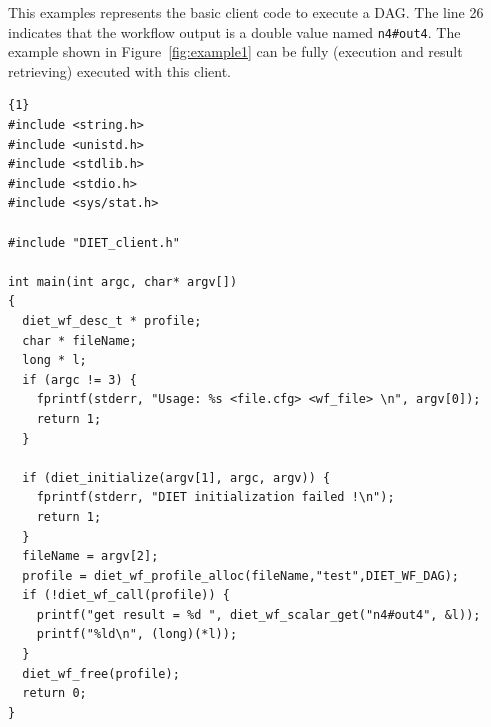 This examples represents the basic client code to execute a DAG.
The line 26 indicates that the workflow output is a double value named
\verb|n4#out4|. The example shown in Figure~\ref{fig:example1} can be
fully (execution and result retrieving) executed with this client.

\begin{lstlisting}{1}
#include <string.h>
#include <unistd.h>
#include <stdlib.h>
#include <stdio.h>
#include <sys/stat.h>

#include "DIET_client.h"

int main(int argc, char* argv[])
{
  diet_wf_desc_t * profile;
  char * fileName;
  long * l;
  if (argc != 3) {
    fprintf(stderr, "Usage: %s <file.cfg> <wf_file> \n", argv[0]);
    return 1;
  }

  if (diet_initialize(argv[1], argc, argv)) {
    fprintf(stderr, "DIET initialization failed !\n");
    return 1;
  }
  fileName = argv[2];
  profile = diet_wf_profile_alloc(fileName,"test",DIET_WF_DAG);
  if (!diet_wf_call(profile)) {
    printf("get result = %d ", diet_wf_scalar_get("n4#out4", &l));
    printf("%ld\n", (long)(*l));
  }
  diet_wf_free(profile);
  return 0;
}
\end{lstlisting}

%
%
%
%


